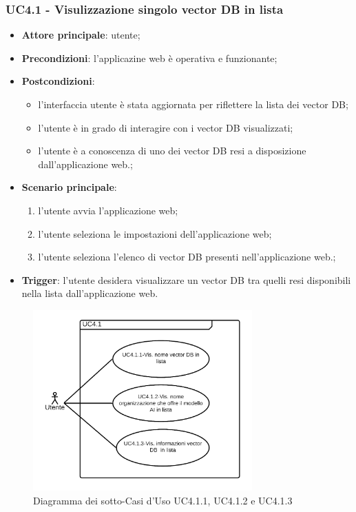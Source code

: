 \documentclass[10pt, a4paper]{article}
\begin{document}
    \subsubsection{UC4.1 - Visulizzazione singolo vector DB in lista}
    \begin{itemize}
        \item \textbf{Attore principale}: utente;
        \item \textbf{Precondizioni}: l'applicazine web è operativa e funzionante;
        \item \textbf{Postcondizioni}: 
        \begin{itemize}
            \item l'interfaccia utente è stata aggiornata per riflettere la lista dei vector DB;
            \item l'utente è in grado di interagire con i vector DB visualizzati;
            \item l'utente è a conoscenza di uno dei vector DB resi a disposizione dall'applicazione web.;
        \end{itemize} 
        \item \textbf{Scenario principale}:
            \begin{enumerate}
                \item l'utente avvia l'applicazione web;
                \item l'utente seleziona le impostazioni dell'applicazione web;
                \item l'utente seleziona l'elenco di vector DB presenti nell'applicazione web.;
            \end{enumerate}
        \item \textbf{Trigger}: l'utente desidera visualizzare un vector DB tra quelli resi disponibili nella lista dall'applicazione web.
    \end{itemize}

    \begin{figure}[h]
        \centering
        \includegraphics[width=0.75\textwidth, height=0.75\textheight, keepaspectratio]{UC-images/UC4.1.1-UC4.1.2-UC4.1.3.png}
        \caption{Diagramma dei sotto-Casi d'Uso UC4.1.1, UC4.1.2 e UC4.1.3}
    \end{figure}
        
\end{document}
